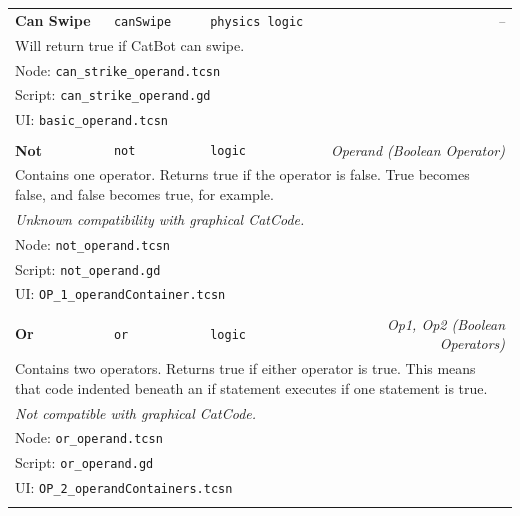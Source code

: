 \begin{center}
\begin{longtable}{lllr}
    \textbf{Can Swipe}
    & \texttt{canSwipe}
    & \texttt{physics logic}
    & \textit{--}
    \\
    \multicolumn{4}{p{0.98\linewidth}}{
        Will return true if CatBot can swipe.
    }
    \\ \multicolumn{4}{l}{Node: \texttt{can\_strike\_operand.tcsn}}
    \\ \multicolumn{4}{l}{Script: \texttt{can\_strike\_operand.gd}}
    \\ \multicolumn{4}{l}{UI: \texttt{basic\_operand.tcsn}}
    \\ \\

    \textbf{Not}
    & \texttt{not}
    & \texttt{logic}
    & \textit{Operand (Boolean Operator)}
    \\
    \multicolumn{4}{p{0.98\linewidth}}{
        Contains one operator.
        Returns true if the operator is false.
        True becomes false, and false becomes true, for example.
    }
    \\
    \multicolumn{4}{p{0.98\linewidth}}{
        \textit{Unknown compatibility with graphical CatCode.}
    }
    \\ \multicolumn{4}{l}{Node: \texttt{not\_operand.tcsn}}
    \\ \multicolumn{4}{l}{Script: \texttt{not\_operand.gd}}
    \\ \multicolumn{4}{l}{UI: \texttt{OP\_1\_operandContainer.tcsn}}
    \\ \\
    
    \textbf{Or}
    & \texttt{or}
    & \texttt{logic}
    & \textit{Op1, Op2 (Boolean Operators)}
    \\
    \multicolumn{4}{p{0.98\linewidth}}{
        Contains two operators.
        Returns true if either operator is true.
        This means that code indented beneath an if statement executes if one statement is true.
    }
    \\
    \multicolumn{4}{p{0.98\linewidth}}{
        \textit{Not compatible with graphical CatCode.}
    }
    \\ \multicolumn{4}{l}{Node: \texttt{or\_operand.tcsn}}
    \\ \multicolumn{4}{l}{Script: \texttt{or\_operand.gd}}
    \\ \multicolumn{4}{l}{UI: \texttt{OP\_2\_operandContainers.tcsn}}
    \\ \\
    
    \bottomrule
  \end{longtable}
\end{center}